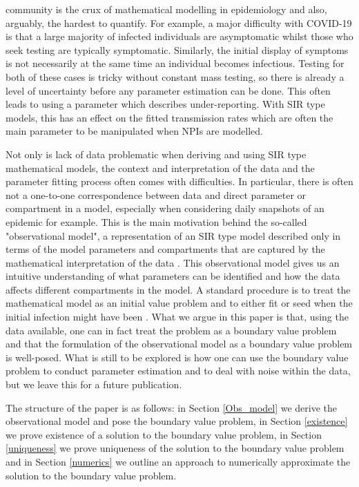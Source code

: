 \documentclass{article}
\begin{document}
community is the crux of mathematical modelling in epidemiology and also, arguably, the hardest to quantify. For example, a major difficulty with COVID-19 is that a large majority of infected individuals are asymptomatic whilst those who seek testing are typically symptomatic. Similarly, the initial display of symptoms is not necessarily at the same time an individual becomes infectious. Testing for both of these cases is tricky without constant mass testing, so there is already a level of uncertainty before any parameter estimation can be done. This often leads to using a parameter which describes under-reporting. With SIR type models, this has an effect on the fitted transmission rates which are often the main parameter to be manipulated when NPIs are modelled. 

Not only is lack of data problematic when deriving and using SIR type mathematical models, the context and interpretation of the data and the parameter fitting process often comes with difficulties. In particular, there is often not a one-to-one correspondence between data and direct parameter or compartment in a model, especially when considering daily snapshots of an epidemic for example. This is the main motivation behind the so-called "observational model", a representation of an SIR type model described only in terms of the model parameters and compartments that are captured by the mathematical interpretation of the data \cite{CVAal21}. This observational model gives us an intuitive understanding of what parameters can be identified and how the data affects different compartments in the model. A standard procedure is to treat the mathematical model as an initial value problem and to either fit or seed when the initial infection might have been \cite{MHTDK21,FLNal20,KSMal21,CVAal21,KTGGL20,CWELBP21}. What we argue in this paper is that, using the data available, one can in fact treat the problem as a boundary value problem and that the formulation of the observational model as a boundary value problem is well-posed. What is still to be explored is how one can use the boundary value problem to conduct parameter estimation and to deal with noise within the data, but we leave this for a future publication. 

The structure of the paper is as follows: in Section \ref{Obs_model} we derive the observational model and pose the boundary value problem, in Section \ref{existence} we prove existence of a solution to the boundary value problem, in Section \ref{uniqueness} we prove uniqueness of the solution to the boundary value problem and in Section \ref{numerics} we outline an approach to numerically approximate the solution to the boundary value problem. 
\end{document}
